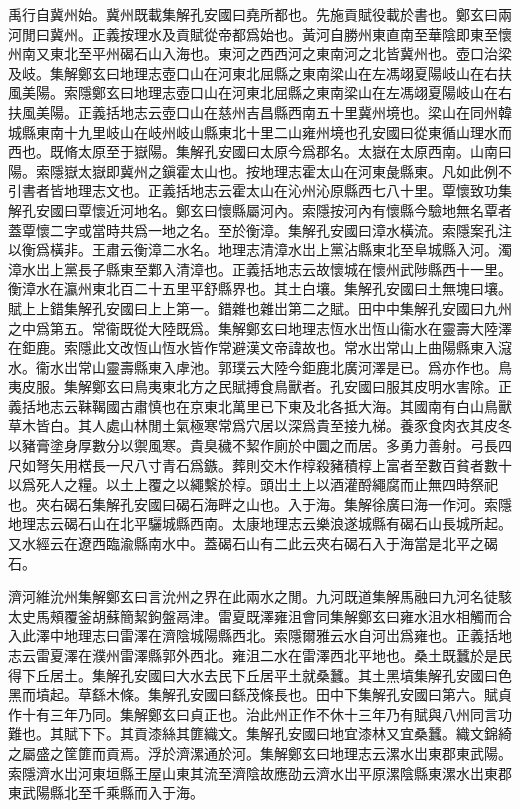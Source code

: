 禹行自冀州始。冀州既載集解孔安國曰堯所都也。先施貢賦役載於書也。鄭玄曰兩河閒曰冀州。正義按理水及貢賦從帝都爲始也。黃河自勝州東直南至華陰即東至懷州南又東北至平州碣石山入海也。東河之西西河之東南河之北皆冀州也。壺口治梁及岐。集解鄭玄曰地理志壺口山在河東北屈縣之東南梁山在左馮翊夏陽岐山在右扶風美陽。索隱鄭玄曰地理志壺口山在河東北屈縣之東南梁山在左馮翊夏陽岐山在右扶風美陽。正義括地志云壺口山在慈州吉昌縣西南五十里冀州境也。梁山在同州韓城縣東南十九里岐山在岐州岐山縣東北十里二山雍州境也孔安國曰從東循山理水而西也。既脩太原至于嶽陽。集解孔安國曰太原今爲郡名。太嶽在太原西南。山南曰陽。索隱嶽太嶽即冀州之鎭霍太山也。按地理志霍太山在河東彘縣東。凡如此例不引書者皆地理志文也。正義括地志云霍太山在沁州沁原縣西七八十里。覃懷致功集解孔安國曰覃懷近河地名。鄭玄曰懷縣屬河內。索隱按河內有懷縣今驗地無名覃者蓋覃懷二字或當時共爲一地之名。至於衡漳。集解孔安國曰漳水橫流。索隱案孔注以衡爲橫非。王肅云衡漳二水名。地理志清漳水岀上黨沾縣東北至阜城縣入河。濁漳水岀上黨長子縣東至鄴入清漳也。正義括地志云故懷城在懷州武陟縣西十一里。衡漳水在瀛州東北百二十五里平舒縣界也。其土白壤。集解孔安國曰土無塊曰壤。賦上上錯集解孔安國曰上上第一。錯雜也雜岀第二之賦。田中中集解孔安國曰九州之中爲第五。常衞既從大陸既爲。集解鄭玄曰地理志恆水岀恆山衞水在靈壽大陸澤在鉅鹿。索隱此文改恆山恆水皆作常避漢文帝諱故也。常水岀常山上曲陽縣東入滱水。衞水岀常山靈壽縣東入虖池。郭璞云大陸今鉅鹿北廣河澤是已。爲亦作也。鳥夷皮服。集解鄭玄曰鳥夷東北方之民賦搏食鳥獸者。孔安國曰服其皮明水害除。正義括地志云靺鞨國古肅慎也在京東北萬里已下東及北各抵大海。其國南有白山鳥獸草木皆白。其人處山林閒土氣極寒常爲穴居以深爲貴至接九梯。養豕食肉衣其皮冬以豬膏塗身厚數分以禦風寒。貴臭穢不絜作廁於中圜之而居。多勇力善射。弓長四尺如弩矢用楛長一尺八寸青石爲鏃。葬則交木作椁殺豬積椁上富者至數百貧者數十以爲死人之糧。以土上覆之以繩繫於椁。頭岀土上以酒灌酹繩腐而止無四時祭祀也。夾右碣石集解孔安國曰碣石海畔之山也。入于海。集解徐廣曰海一作河。索隱地理志云碣石山在北平驪城縣西南。太康地理志云樂浪遂城縣有碣石山長城所起。又水經云在遼西臨渝縣南水中。蓋碣石山有二此云夾右碣石入于海當是北平之碣石。

濟河維沇州集解鄭玄曰言沇州之界在此兩水之閒。九河既道集解馬融曰九河名徒駭太史馬頰覆釜胡蘇簡絜鉤盤鬲津。雷夏既澤雍沮會同集解鄭玄曰雍水沮水相觸而合入此澤中地理志曰雷澤在濟陰城陽縣西北。索隱爾雅云水自河岀爲雍也。正義括地志云雷夏澤在濮州雷澤縣郭外西北。雍沮二水在雷澤西北平地也。桑土既蠶於是民得下丘居土。集解孔安國曰大水去民下丘居平土就桑蠶。其土黑墳集解孔安國曰色黑而墳起。草繇木條。集解孔安國曰繇茂條長也。田中下集解孔安國曰第六。賦貞作十有三年乃同。集解鄭玄曰貞正也。治此州正作不休十三年乃有賦與八州同言功難也。其賦下下。其貢漆絲其篚織文。集解孔安國曰地宜漆林又宜桑蠶。織文錦綺之屬盛之筐篚而貢焉。浮於濟漯通於河。集解鄭玄曰地理志云漯水岀東郡東武陽。索隱濟水岀河東垣縣王屋山東其流至濟陰故應劭云濟水岀平原漯陰縣東漯水岀東郡東武陽縣北至千乘縣而入于海。

